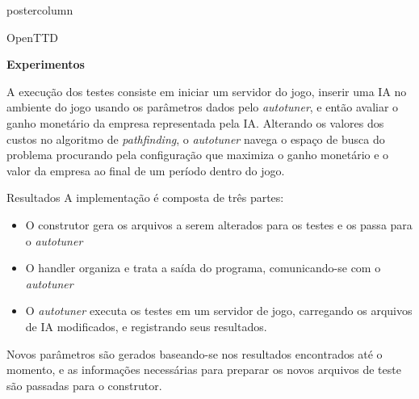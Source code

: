 \documentclass[final]{beamer}
\begin{document}
\begin{frame}
\begin{columns}
\begin{column}{.5\textwidth}
\begin{beamercolorbox}[center,wd=\textwidth]{postercolumn}
\begin{minipage}[T]{.95\textwidth}
{\begin{block}{OpenTTD}
                \vspace*{0,2cm}
                
                \textbf{Experimentos}
                
                \vspace*{0.2cm}
                A execução dos testes consiste em iniciar um servidor do jogo, inserir uma IA no ambiente do jogo usando os parâmetros dados pelo \textit{autotuner}, e então avaliar o ganho monetário da empresa representada pela IA. Alterando os valores dos custos no algoritmo de \textit{pathfinding}, o \textit{autotuner} navega o espaço de busca do problema procurando pela configuração que maximiza o ganho monetário e o valor da empresa ao final de um período dentro do jogo.
                
                \vspace*{0.5cm} 
            \end{block}

            \vspace*{0.2cm} 
            
            \begin{block}{Resultados}
              \justifying 
                A implementação é composta de três partes:
                \begin{itemize}
                	\item O construtor gera os arquivos a serem alterados para os testes e os passa para o \textit{autotuner}
                	\item O handler organiza e trata a saída do programa, comunicando-se com o \textit{autotuner}
                	\item O \textit{autotuner} executa os testes em um servidor de jogo, carregando os arquivos de IA modificados, e registrando seus resultados.
                \end{itemize}
                
                \vspace*{0.2cm}
                Novos parâmetros são gerados baseando-se nos resultados encontrados até o momento, e as informações necessárias para preparar os novos arquivos de teste são passadas para o construtor.


\end{block}}
\end{minipage}
\end{beamercolorbox}
\end{column}
\end{columns}
\end{frame}
\end{document}
